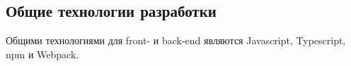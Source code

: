 \subsection{Общие технологии разработки}

Общими технологиями для front- и back-end являются Javascript, Typescript, npm и Webpack.








